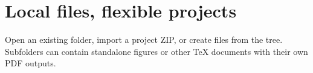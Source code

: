 \section{Local files, flexible projects}
Open an existing folder, import a project ZIP, or create files
from the tree. Subfolders can contain standalone figures or
other TeX documents with their own PDF outputs.
